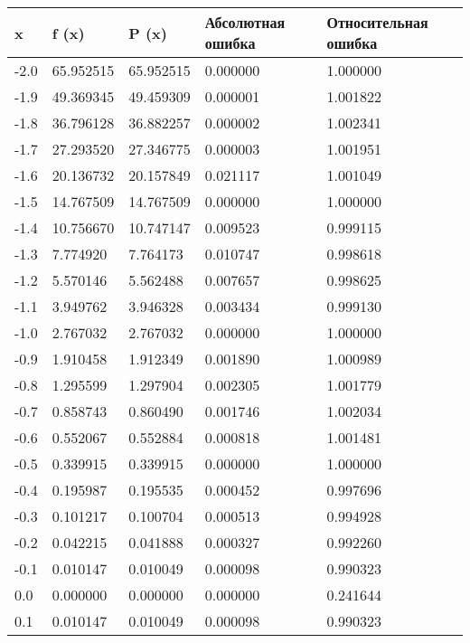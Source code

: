 \documentclass[13pt, a4paper, twoside]{article}
\begin{document}
\begin{table}[!ht]
    \centering
    \begin{tabular}{|l|l|l|l|l|}
    \hline
        x & f (x) & P (x) & Абсолютная ошибка & Относительная ошибка \\ \hline
        -2.0 & 65.952515 & 65.952515 & 0.000000 & 1.000000 \\ \hline
        -1.9 & 49.369345 & 49.459309 & 0.000001 & 1.001822 \\ \hline
        -1.8 & 36.796128 & 36.882257 & 0.000002 & 1.002341 \\ \hline
        -1.7 & 27.293520 & 27.346775 & 0.000003 & 1.001951 \\ \hline
        -1.6 & 20.136732 & 20.157849 & 0.021117 & 1.001049 \\ \hline
        -1.5 & 14.767509 & 14.767509 & 0.000000 & 1.000000 \\ \hline
        -1.4 & 10.756670 & 10.747147 & 0.009523 & 0.999115 \\ \hline
        -1.3 & 7.774920 & 7.764173 & 0.010747 & 0.998618 \\ \hline
        -1.2 & 5.570146 & 5.562488 & 0.007657 & 0.998625 \\ \hline
        -1.1 & 3.949762 & 3.946328 & 0.003434 & 0.999130 \\ \hline
        -1.0 & 2.767032 & 2.767032 & 0.000000 & 1.000000 \\ \hline
        -0.9 & 1.910458 & 1.912349 & 0.001890 & 1.000989 \\ \hline
        -0.8 & 1.295599 & 1.297904 & 0.002305 & 1.001779 \\ \hline
        -0.7 & 0.858743 & 0.860490 & 0.001746 & 1.002034 \\ \hline
        -0.6 & 0.552067 & 0.552884 & 0.000818 & 1.001481 \\ \hline
        -0.5 & 0.339915 & 0.339915 & 0.000000 & 1.000000 \\ \hline
        -0.4 & 0.195987 & 0.195535 & 0.000452 & 0.997696 \\ \hline
        -0.3 & 0.101217 & 0.100704 & 0.000513 & 0.994928 \\ \hline
        -0.2 & 0.042215 & 0.041888 & 0.000327 & 0.992260 \\ \hline
        -0.1 & 0.010147 & 0.010049 & 0.000098 & 0.990323 \\ \hline
        0.0 & 0.000000 & 0.000000 & 0.000000 & 0.241644 \\ \hline
        0.1 & 0.010147 & 0.010049 & 0.000098 & 0.990323 \\ \hline

\end{tabular}
\end{table}
\end{document}
